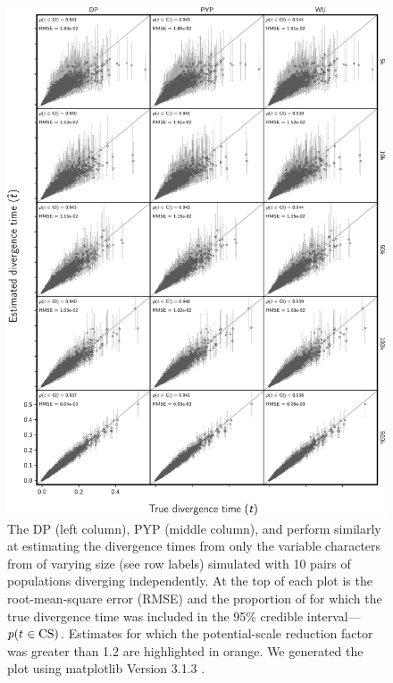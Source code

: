 \begin{figure}[htbp]
    \begin{center}
        \includegraphics[width=\textwidth,height=0.9\textheight,keepaspectratio]{../images/from-project-repo/var-only-nchars-div-time-scatter-cropped.pdf}
        \captionsetup{name=Figure S, labelformat=noSpace, listformat=sFigList}
        \caption{\footnotesize
        The DP (left column),
        PYP (middle column),
        and
        \wunif
        perform similarly at estimating the divergence times from only the
        variable characters from \datasets of varying size (see row labels)
        simulated with 10 pairs of populations diverging independently.
        At the top of each plot is the root-mean-square error (RMSE)
        and
        the proportion of \datasets for which the true divergence time was
        included in the 95\% credible interval---$p(t_{} \in
        \textrm{CS})$.
        Estimates for which the potential-scale reduction factor was greater
        than 1.2 \citep{Brooks1998} are highlighted in orange.
        We generated the plot using matplotlib Version 3.1.3
        \citep{matplotlib}.
        }
        \label{fig:varonlydivtimegridbysize}
    \end{center}
\end{figure}




